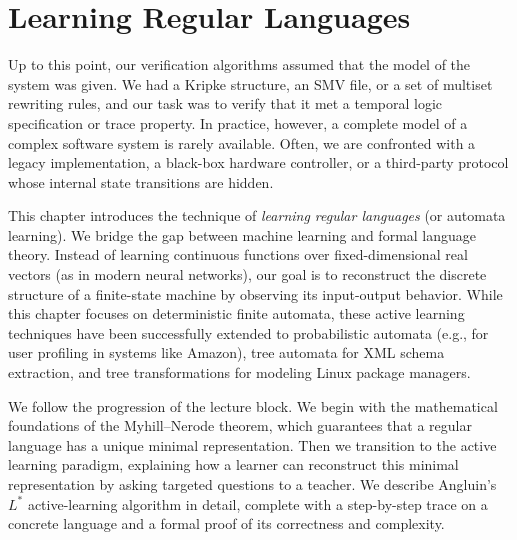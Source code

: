 
\chapter{Learning Regular Languages}
\label{ch:learning-languages}


Up to this point, our verification algorithms assumed that the model of the system was given. We had a Kripke structure, an SMV file, or a set of multiset rewriting rules, and our task was to verify that it met a temporal logic specification or trace property. In practice, however, a complete model of a complex software system is rarely available. Often, we are confronted with a legacy implementation, a black-box hardware controller, or a third-party protocol whose internal state transitions are hidden.

This chapter introduces the technique of \emph{learning regular languages} (or automata learning). We bridge the gap between machine learning and formal language theory. Instead of learning continuous functions over fixed-dimensional real vectors (as in modern neural networks), our goal is to reconstruct the discrete structure of a finite-state machine by observing its input-output behavior. While this chapter focuses on deterministic finite automata, these active learning techniques have been successfully extended to probabilistic automata (e.g., for user profiling in systems like Amazon), tree automata for XML schema extraction, and tree transformations for modeling Linux package managers.

We follow the progression of the lecture block. We begin with the mathematical foundations of the Myhill--Nerode theorem, which guarantees that a regular language has a unique minimal representation. Then we transition to the active learning paradigm, explaining how a learner can reconstruct this minimal representation by asking targeted questions to a teacher. We describe Angluin's $L^*$ active-learning algorithm in detail, complete with a step-by-step trace on a concrete language and a formal proof of its correctness and complexity.

